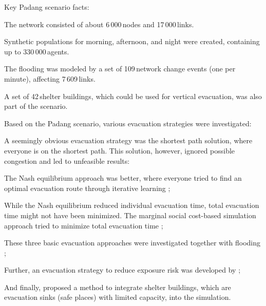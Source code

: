 Key Padang scenario facts:
\begin{compactitem}
\item The network consisted of about 6\,000\,nodes and 17\,000\,links.
\item Synthetic populations for morning, afternoon, and night were created, containing up to 330\,000\,agents.
\item The flooding was modeled by a set of 109\,network change events (one per minute), affecting 7\,609\,links.
\item A set of 42\,shelter buildings, which could be used for vertical evacuation, was also part of the scenario.
\end{compactitem}
Based on the Padang scenario, various evacuation strategies were investigated:
\begin{compactitem}
\item A seemingly obvious evacuation strategy was the shortest path solution, where everyone is on the shortest path. This solution, however, ignored possible congestion and led to unfeasible results:
\item The Nash equilibrium approach was better, where everyone tried to find an optimal evacuation route through iterative learning \citep{00LaemmelKluepfelNagel2009EvacPadangAtBookTimmermanns};
\item While the Nash equilibrium reduced individual evacuation time, total evacuation time might not have been minimized. The marginal social cost-based simulation approach tried to minimize total evacuation time \citep{00LaemmelFloetteroed2009KISysOptEvac,00DresslerFloetteroedLaemmelNagelSkutella2010OptimalEvacuationLargeScaleScenarios};
\item These three basic evacuation approaches were investigated together with flooding \citep{00LaemmelGretherNagel2009TimeDependentNetworks,Laemmel_PhDThesis_2011};
\item Further, an evacuation strategy to reduce exposure risk was developed by \citep{00LaemmelKluepfelNagel2010PEDRiskPrinted};
\item And finally, \citet{00FloetteroedLaemmel2010ICECShelterEvac} proposed a method to integrate shelter buildings, which are evacuation sinks (\ie safe places) 
with limited capacity, into the simulation.  
\end{compactitem}

